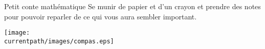 

\hspace{1cm}

\begin{center}
    \begin{myBox}{Petit conte mathématique}
        Se munir de papier et d'un crayon et prendre des notes pour pouvoir reparler de ce qui vous aura sembler important.

        \bigskip
        
    \end{myBox}
\end{center}

\hspace{1cm}

\begin{center}
    \texttt{[image: \\currentpath/images/compas.eps]}
\end{center}
